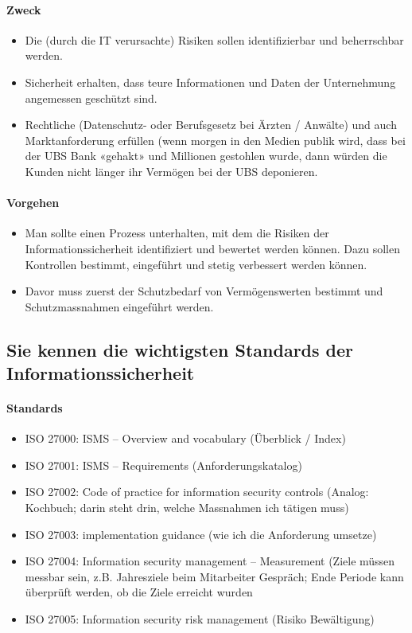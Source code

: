 \documentclass[10pt,a4paper]{article}
\begin{document}
\paragraph*{Zweck}
\begin{itemize}[noitemsep,topsep=0pt,leftmargin=*]
    \item Die (durch die IT verursachte) Risiken sollen identifizierbar und beherrschbar werden.
    \item Sicherheit erhalten, dass teure Informationen und Daten der Unternehmung angemessen geschützt sind.
    \item Rechtliche (Datenschutz- oder Berufsgesetz bei Ärzten / Anwälte) und auch Marktanforderung erfüllen (wenn morgen in den Medien publik wird, dass bei der UBS Bank «gehakt» und Millionen gestohlen wurde, dann würden die Kunden nicht länger ihr Vermögen bei der UBS deponieren.
\end{itemize}
\paragraph*{Vorgehen}
\begin{itemize}[noitemsep,topsep=0pt,leftmargin=*]
    \item Man sollte einen Prozess unterhalten, mit dem die Risiken der Informationssicherheit identifiziert und bewertet werden können. Dazu sollen Kontrollen bestimmt, eingeführt und stetig verbessert werden können.
    \item Davor muss zuerst der Schutzbedarf von Vermögenswerten bestimmt und Schutzmassnahmen eingeführt werden.
\end{itemize}


\subsection*{Sie kennen die wichtigsten Standards der Informationssicherheit}
\paragraph*{Standards}
\begin{itemize}[noitemsep,topsep=0pt,leftmargin=*]
    \item ISO 27000: ISMS – Overview and vocabulary (Überblick / Index)
    \item ISO 27001: ISMS – Requirements (Anforderungskatalog)
    \item ISO 27002: Code of practice for information security controls (Analog: Kochbuch; darin steht drin, welche Massnahmen ich tätigen muss)
    \item ISO 27003: implementation guidance (wie ich die Anforderung umsetze)
    \item ISO 27004: Information security management – Measurement (Ziele müssen messbar sein, z.B. Jahresziele beim Mitarbeiter Gespräch; Ende Periode kann überprüft werden, ob die Ziele erreicht wurden
    \item ISO 27005: Information security risk management (Risiko Bewältigung)
\end{itemize}
\end{document}
